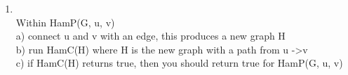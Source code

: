 \documentclass[11pt]{article}
\begin{document}
\begin{enumerate}
\item \\
    \tab Within HamP(G, u, v)\\
    \tab a) connect u and v with an edge, this produces a new graph H\\
    \tab b) run HamC(H) where H is the new graph with a path from u -\textgreater v\\
    \tab c) if HamC(H) returns true, then you should return true for HamP(G, u, v)\\

\end{enumerate}
\end{document}
